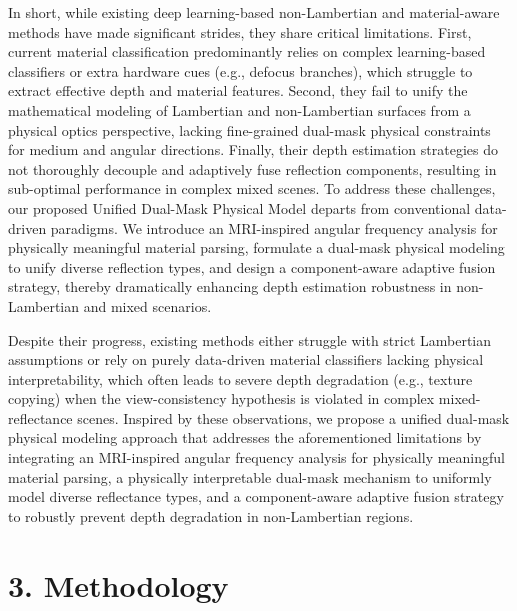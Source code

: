 \documentclass[lettersize,journal]{IEEEtran}
\begin{document}
In short, while existing deep learning-based non-Lambertian and material-aware methods have made significant strides, they share critical limitations. First, current material classification predominantly relies on complex learning-based classifiers or extra hardware cues (e.g., defocus branches), which struggle to extract effective depth and material features. Second, they fail to unify the mathematical modeling of Lambertian and non-Lambertian surfaces from a physical optics perspective, lacking fine-grained dual-mask physical constraints for medium and angular directions. Finally, their depth estimation strategies do not thoroughly decouple and adaptively fuse reflection components, resulting in sub-optimal performance in complex mixed scenes. To address these challenges, our proposed Unified Dual-Mask Physical Model departs from conventional data-driven paradigms. We introduce an MRI-inspired angular frequency analysis for physically meaningful material parsing, formulate a dual-mask physical modeling to unify diverse reflection types, and design a component-aware adaptive fusion strategy, thereby dramatically enhancing depth estimation robustness in non-Lambertian and mixed scenarios.

Despite their progress, existing methods either struggle with strict Lambertian assumptions or rely on purely data-driven material classifiers lacking physical interpretability, which often leads to severe depth degradation (e.g., texture copying) when the view-consistency hypothesis is violated in complex mixed-reflectance scenes. Inspired by these observations, we propose a unified dual-mask physical modeling approach that addresses the aforementioned limitations by integrating an MRI-inspired angular frequency analysis for physically meaningful material parsing, a physically interpretable dual-mask mechanism to uniformly model diverse reflectance types, and a component-aware adaptive fusion strategy to robustly prevent depth degradation in non-Lambertian regions.

\section{3. Methodology}
\end{document}
